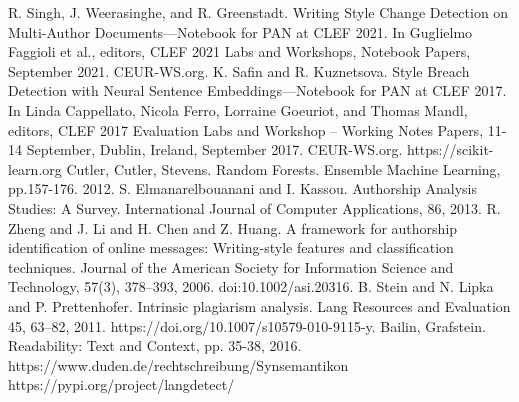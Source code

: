 \documentclass[conference]{IEEEtran}
\begin{document}
\begin{thebibliography}{00}
 R. Singh, J. Weerasinghe, and R. Greenstadt. Writing Style Change Detection on Multi-Author Documents—Notebook for PAN at CLEF 2021. In Guglielmo Faggioli et al., editors, CLEF 2021 Labs and Workshops, Notebook Papers, September 2021. CEUR-WS.org.
 K. Safin and R. Kuznetsova. Style Breach Detection with Neural Sentence Embeddings—Notebook for PAN at CLEF 2017. In Linda Cappellato, Nicola Ferro, Lorraine Goeuriot, and Thomas Mandl, editors, CLEF 2017 Evaluation Labs and Workshop – Working Notes Papers, 11-14 September, Dublin, Ireland, September 2017. CEUR-WS.org.
 https://scikit-learn.org
 Cutler, Cutler, Stevens. Random Forests. Ensemble Machine Learning, pp.157-176. 2012.
 S. Elmanarelbouanani and I. Kassou. Authorship Analysis Studies: A Survey. International Journal of Computer Applications, 86, 2013.
 R. Zheng and J. Li and H. Chen and Z. Huang. A framework for authorship identification of online messages: Writing-style features and classification techniques. Journal of the American Society for Information Science and Technology, 57(3), 378–393, 2006. doi:10.1002/asi.20316.
 B. Stein and N. Lipka and P. Prettenhofer. Intrinsic plagiarism analysis. Lang Resources and Evaluation 45, 63–82, 2011. https://doi.org/10.1007/s10579-010-9115-y.
 Bailin, Grafstein. Readability: Text and Context, pp. 35-38, 2016.
 https://www.duden.de/rechtschreibung/Synsemantikon
 https://pypi.org/project/langdetect/
\end{thebibliography}
\end{document}
